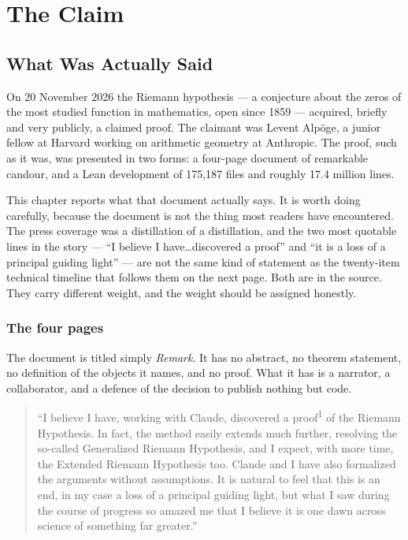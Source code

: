 \part{The Claim}
\label{part:claim}

\chapter{What Was Actually Said}
\label{ch:claim}

On 20 November 2026 the Riemann hypothesis --- a conjecture about the zeros of
the most studied function in mathematics, open since 1859 --- acquired, briefly
and very publicly, a claimed proof. The claimant was Levent Alpöge, a junior
fellow at Harvard working on arithmetic geometry at Anthropic. The proof, such
as it was, was presented in two forms: a four-page document of remarkable
candour, and a Lean development of 175{,}187 files and roughly 17.4 million
lines.

This chapter reports what that document actually says. It is worth doing
carefully, because the document is not the thing most readers have encountered.
The press coverage was a distillation of a distillation, and the two most
quotable lines in the story --- ``I believe I have\ldots discovered a proof'' and
``it is a loss of a principal guiding light'' --- are not the same kind of
statement as the twenty-item technical timeline that follows them on the next
page. Both are in the source. They carry different weight, and the weight
should be assigned honestly.

\section{The four pages}The document is titled simply \emph{Remark}. It has no abstract, no theorem
statement, no definition of the objects it names, and no proof. What it has is
a narrator, a collaborator, and a defence of the decision to publish nothing
but code.

\begin{quote}
\small
``I believe I have, working with Claude, discovered a proof\textsuperscript{1}
of the Riemann Hypothesis. In fact, the method easily extends much further,
resolving the so-called Generalized Riemann Hypothesis, and I expect, with more
time, the Extended Riemann Hypothesis too. Claude and I have also formalized
the arguments without assumptions. It is natural to feel that this is an end, in
my case a loss of a principal guiding light, but what I saw during the course of
progress so amazed me that I believe it is one dawn across science of something
far greater.''
\end{quote}

